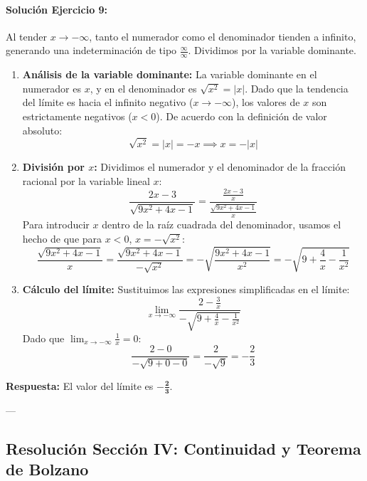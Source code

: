 \documentclass[11pt,letterpaper]{article}
\begin{document}
\paragraph{Solución Ejercicio 9:}
Al tender $x \to -\infty$, tanto el numerador como el denominador tienden a infinito, generando una indeterminación de tipo $\frac{\infty}{\infty}$. Dividimos por la variable dominante.
\begin{enumerate}
    \item \textbf{Análisis de la variable dominante:} La variable dominante en el numerador es $x$, y en el denominador es $\sqrt{x^2} = |x|$. Dado que la tendencia del límite es hacia el infinito negativo ($x \to -\infty$), los valores de $x$ son estrictamente negativos ($x < 0$). De acuerdo con la definición de valor absoluto:
    $$\sqrt{x^2} = |x| = -x \implies x = -|x|$$
    \item \textbf{División por $x$:} Dividimos el numerador y el denominador de la fracción racional por la variable lineal $x$:
    $$\frac{2x - 3}{\sqrt{9x^2 + 4x - 1}} = \frac{\frac{2x - 3}{x}}{\frac{\sqrt{9x^2 + 4x - 1}}{x}}$$
    Para introducir $x$ dentro de la raíz cuadrada del denominador, usamos el hecho de que para $x < 0$, $x = -\sqrt{x^2}$:
    $$\frac{\sqrt{9x^2 + 4x - 1}}{x} = \frac{\sqrt{9x^2 + 4x - 1}}{-\sqrt{x^2}} = -\sqrt{\frac{9x^2 + 4x - 1}{x^2}} = -\sqrt{9 + \frac{4}{x} - \frac{1}{x^2}}$$
    \item \textbf{Cálculo del límite:} Sustituimos las expresiones simplificadas en el límite:
    $$\lim_{x\to -\infty} \frac{2 - \frac{3}{x}}{-\sqrt{9 + \frac{4}{x} - \frac{1}{x^2}}}$$
    Dado que $\lim_{x\to -\infty} \frac{1}{x} = 0$:
    $$\frac{2 - 0}{-\sqrt{9 + 0 - 0}} = \frac{2}{-\sqrt{9}} = -\frac{2}{3}$$
\end{enumerate}
\textbf{Respuesta:} El valor del límite es $\mathbf{-\frac{2}{3}}$.

---

\subsection{Resolución Sección IV: Continuidad y Teorema de Bolzano}
\end{document}

